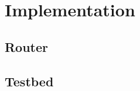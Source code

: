 \chapter{Implementation} %
\label{chap:Implementation}

\section{Router} %
\label{sec:Router}



\section{Testbed} %
\label{sec:Testbed_Implementation}



